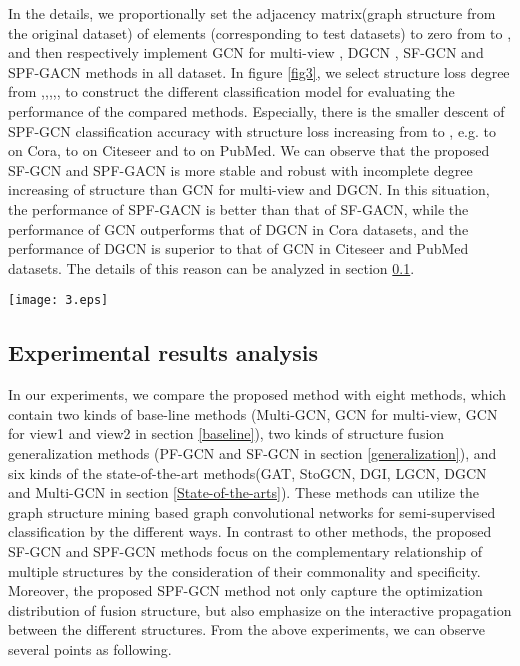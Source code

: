 \documentclass[review]{elsarticle}
\begin{document}
In the details, we proportionally set the adjacency matrix(graph structure from the original dataset) of elements (corresponding to test datasets) to zero from  to , and then respectively implement GCN for multi-view \cite{kipf2016semi}, DGCN \cite{zhuang2018dual}, SF-GCN and SPF-GACN methods in all dataset. In figure \ref{fig3}, we select structure loss degree from ,,,,, to construct the different classification model for evaluating the performance of the compared methods. Especially, there is the smaller descent of SPF-GCN classification accuracy with structure loss increasing from  to , e.g.  to  on Cora,  to  on Citeseer and  to  on PubMed. We can observe that the proposed SF-GCN and SPF-GACN is more stable and robust with incomplete degree increasing of structure than GCN for multi-view and DGCN. In this situation, the performance of SPF-GACN is better than that of SF-GACN, while the performance of GCN outperforms that of DGCN in Cora datasets, and the performance of DGCN is superior to that of GCN in Citeseer and PubMed datasets. The details of this reason can be analyzed in section \ref{analysis}.

\begin{figure*}[ht]
 \begin{center}
\texttt{[image: 3.eps]}
\vspace{-0.2in}
 \caption{Impact of structure loss on classification accuracy for citation networks on (a) Cora,(b)Citeseer and (c)PubMed datasets.}
  \label{fig3}
  \end{center}
 \end{figure*}

\subsection{Experimental results analysis}
\label{analysis}
In our experiments, we compare the proposed method with eight methods, which contain two kinds of base-line methods (Multi-GCN\cite{khan2019multi}, GCN \cite{kipf2016semi} for multi-view, GCN \cite{kipf2016semi} for view1 and view2 in section \ref{baseline}), two kinds of structure fusion generalization methods (PF-GCN and SF-GCN in section \ref{generalization}), and six kinds of the state-of-the-art methods(GAT\cite{Veli2017Graph}, StoGCN\cite{2017arXiv171010568C}, DGI\cite{Veli2018Deep}, LGCN\cite{2018arXiv180803965G}, DGCN\cite{zhuang2018dual} and Multi-GCN\cite{khan2019multi} in section \ref{State-of-the-arts}). These methods can utilize the graph structure mining based graph convolutional networks for semi-supervised classification by the different ways. In contrast to other methods, the proposed SF-GCN and SPF-GCN methods focus on the complementary relationship of multiple structures by the consideration of their commonality and specificity. Moreover, the proposed SPF-GCN method not only capture the optimization distribution of fusion structure, but also emphasize on the interactive propagation between the different structures. From the above experiments, we can observe several points as following.
\end{document}
